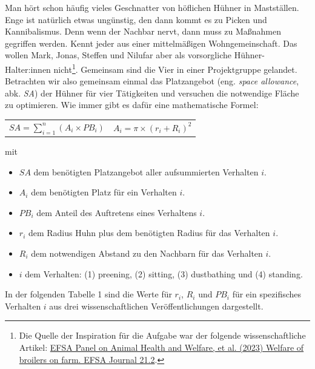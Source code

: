 \documentclass[a4paper, 9pt]{scrartcl}\usepackage[]{graphicx}\usepackage[]{xcolor}
\begin{document}
Man hört schon häufig vieles Geschnatter von höflichen Hühner in Mastställen. Enge ist natürlich etwas ungünstig, den dann kommt es zu Picken und Kannibalismus. Denn wenn der Nachbar nervt, dann muss zu Maßnahmen gegriffen werden. Kennt jeder aus einer mittelmäßigen Wohngemeinschaft. Das wollen Mark, Jonas, Steffen und Nilufar aber als vorsorgliche Hühner-Halter:innen nicht\footnote{Die Quelle der Inspiration für die Aufgabe war der folgende wissenschaftliche Artikel: \href{https://www.efsa.europa.eu/en/efsajournal/pub/7788}{EFSA Panel on Animal Health and Welfare, et al. (2023) Welfare of broilers on farm. EFSA Journal 21.2}.}. Gemeinsam sind die Vier in einer Projektgruppe gelandet. Betrachten wir also gemeinsam einmal das Platzangebot (eng. \textit{space allowance}, abk. \textit{SA}) der Hühner für vier Tätigkeiten und versuchen die notwendige Fläche zu optimieren. Wie immer gibt es dafür eine mathematische Formel:

\begin{center}
  \begin{tabular}{cc}
    $SA = \sum^n_{i = 1} (A_i \times PB_i)$ & $A_i = \pi \times (r_i + R_i)^2$\\
  \end{tabular}
\end{center}

\vspace{-2Ex}

mit

\begin{itemize}[noitemsep]
\item $SA$ dem benötigten Platzangebot aller aufsummierten Verhalten $i$.
\item $A_i$ dem benötigten Platz für ein Verhalten $i$. 
\item $PB_i$ dem Anteil des Auftretens eines Verhaltens $i$.
\item $r_i$ dem Radius Huhn plus dem benötigten Radius für das Verhalten $i$.
\item $R_i$ dem notwendigen Abstand zu den Nachbarn für das Verhalten $i$.    
\item $i$ dem Verhalten: (1) preening, (2) sitting, (3)
  dustbathing und (4) standing.
\end{itemize}

In der folgenden Tabelle 1 sind die Werte für $r_i$, $R_i$ und $PB_i$ für ein spezifisches Verhalten $i$ aus drei wissenschaftlichen Veröffentlichungen dargestellt.

\vspace{-1Ex}
\end{document}
